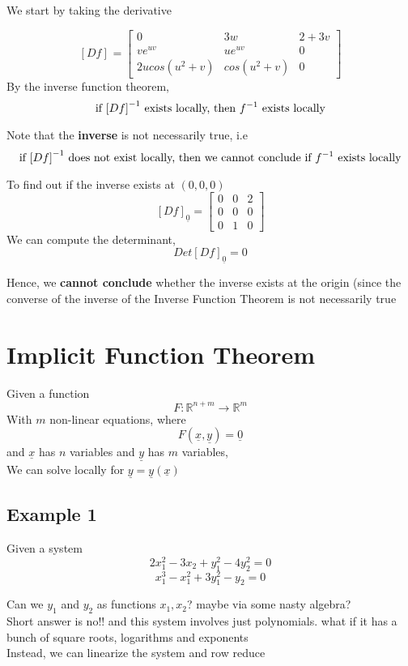 We start by taking the derivative

\[
  \left[ D f \right]_{} = \begin{bmatrix} 
     0 & 3w & 2+3v \\  
     ve^{uv} & ue^{uv} & 0\\  
     2ucos(u^2 + v) & cos(u^2 + v) & 0
  \end{bmatrix}
\] 
By the inverse function theorem, 
\[
   \text{if $ \left[ D f \right]_{}^{-1} $ exists locally, then $f^{-1}$ exists locally}
\] 

Note that the \textbf{inverse} is not necessarily true, i.e 
\[
   \text{if $ \left[ D f \right]_{}^{-1} $ does not exist locally, then we cannot conclude if $f^{-1}$ exists locally}
\] 
  

To find out if the inverse exists at $(0, 0, 0)$
 \[
  \left[ D f \right]_{ \underline{0}} = \begin{bmatrix} 
     0 & 0 & 2 \\
     0 & 0 & 0 \\
     0 & 1 & 0
  \end{bmatrix}
\] 
We can compute the determinant, \[
  Det \left[ D f \right]_{ \underline{0}} = 0
\] 

Hence, we \textbf{cannot conclude} whether the inverse exists at the origin (since the converse of the inverse of the Inverse Function Theorem is not necessarily true

\section{Implicit Function Theorem}

Given a function 
\[
   F: \mathbb{R}^{n+m} \to \mathbb{R}^m
\] 
With $m$ non-linear equations, where 
\[
  F( \underline{x}, \underline{y}) = \underline{0}
\] 
and $ \underline{x}$ has $n$ variables and  $ \underline{y}$ has $m$ variables,\\

We can solve locally for $ \underline{y} = \underline{y} ( \underline{x})$ 


\subsection{Example 1}
Given a system 
\[
   2x_1^{2} - 3x_2 + y_1^{2} - 4y_2^{2} = 0
\]  
\[
   x_1^{3} - x_1^{2} + 3y_1^{2} -y_2 = 0
\] 

Can we $y_1$ and $y_2$ as functions $ x_1, x_2$? maybe via some nasty algebra? \\
 
Short answer is no!! and this system involves just polynomials. what if it has a bunch of square roots, logarithms and exponents \\

Instead, we can linearize the system and row reduce
